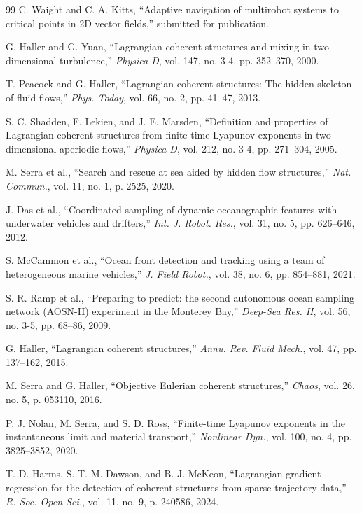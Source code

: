 \documentclass[lettersize,journal]{IEEEtran}
\begin{document}
\begin{thebibliography}{99}
 C. Waight and C. A. Kitts, ``Adaptive navigation of multirobot
systems to critical points in 2D vector fields,'' submitted for publication.

 G. Haller and G. Yuan, ``Lagrangian coherent structures and mixing
in two-dimensional turbulence,'' \textit{Physica D}, vol. 147, no. 3-4,
pp. 352--370, 2000.

 T. Peacock and G. Haller, ``Lagrangian coherent structures: The
hidden skeleton of fluid flows,'' \textit{Phys. Today}, vol. 66, no. 2,
pp. 41--47, 2013.

 S. C. Shadden, F. Lekien, and J. E. Marsden, ``Definition and
properties of Lagrangian coherent structures from finite-time Lyapunov
exponents in two-dimensional aperiodic flows,'' \textit{Physica D}, vol. 212,
no. 3-4, pp. 271--304, 2005.

 M. Serra et al., ``Search and rescue at sea aided by hidden flow
structures,'' \textit{Nat. Commun.}, vol. 11, no. 1, p. 2525, 2020.

 J. Das et al., ``Coordinated sampling of dynamic oceanographic
features with underwater vehicles and drifters,'' \textit{Int. J. Robot.
Res.}, vol. 31, no. 5, pp. 626--646, 2012.

 S. McCammon et al., ``Ocean front detection and tracking using a
team of heterogeneous marine vehicles,'' \textit{J. Field Robot.}, vol. 38,
no. 6, pp. 854--881, 2021.

 S. R. Ramp et al., ``Preparing to predict: the second autonomous
ocean sampling network (AOSN-II) experiment in the Monterey Bay,''
\textit{Deep-Sea Res. II}, vol. 56, no. 3-5, pp. 68--86, 2009.

 G. Haller, ``Lagrangian coherent structures,'' \textit{Annu. Rev.
Fluid Mech.}, vol. 47, pp. 137--162, 2015.

 M. Serra and G. Haller, ``Objective Eulerian coherent
structures,'' \textit{Chaos}, vol. 26, no. 5, p. 053110, 2016.

 P. J. Nolan, M. Serra, and S. D. Ross, ``Finite-time Lyapunov
exponents in the instantaneous limit and material transport,''
\textit{Nonlinear Dyn.}, vol. 100, no. 4, pp. 3825--3852, 2020.

 T. D. Harms, S. T. M. Dawson, and B. J. McKeon, ``Lagrangian
gradient regression for the detection of coherent structures from sparse
trajectory data,'' \textit{R. Soc. Open Sci.}, vol. 11, no. 9,
p. 240586, 2024.


\end{thebibliography}
\end{document}

